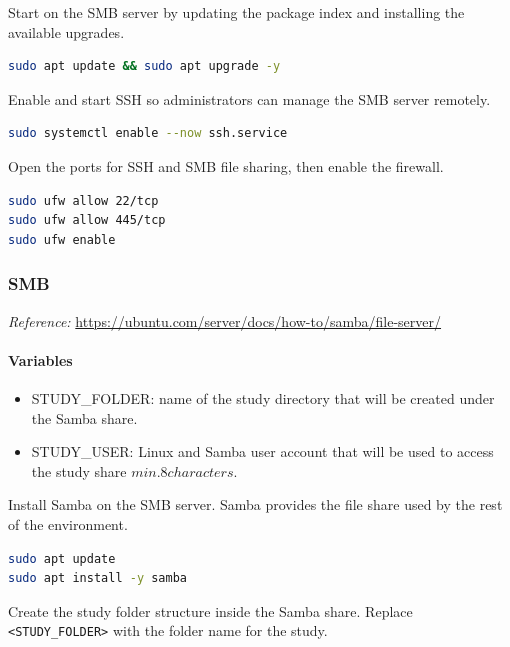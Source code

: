 \documentclass{article}
\begin{document}
Start on the SMB server by updating the package index and installing the available upgrades.

\begin{lstlisting}[language=sh]
sudo apt update && sudo apt upgrade -y
\end{lstlisting}

Enable and start SSH so administrators can manage the SMB server remotely.

\begin{lstlisting}[language=sh]
sudo systemctl enable --now ssh.service
\end{lstlisting}

Open the ports for SSH and SMB file sharing, then enable the firewall.

\begin{lstlisting}[language=sh]
sudo ufw allow 22/tcp
sudo ufw allow 445/tcp
sudo ufw enable
\end{lstlisting}

\vspace{0.4cm}
\subsubsection{SMB}

\noindent\textit{Reference:} \url{https://ubuntu.com/server/docs/how-to/samba/file-server/}\par\vspace{0.4cm}

\paragraph{Variables}
\begin{itemize}
	\item STUDY\_FOLDER: name of the study directory that will be created under the Samba share.
	\item STUDY\_USER: Linux and Samba user account that will be used to access the study share \(min. 8 characters\).
\end{itemize}

Install Samba on the SMB server. Samba provides the file share used by the rest of the environment.

\begin{lstlisting}[language=sh]
sudo apt update
sudo apt install -y samba
\end{lstlisting}

Create the study folder structure inside the Samba share. Replace \texttt{<STUDY\_FOLDER>} with the folder name for the study.
\end{document}
